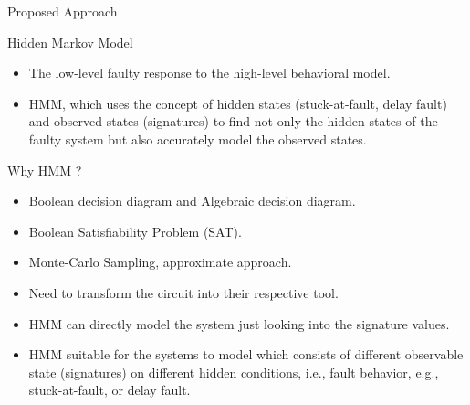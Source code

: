 \documentclass[aspectratio=1610]{beamer}
\begin{document}
\begin{frame}{Proposed Approach}

\vspace{-0.2cm}
\begin{block}{Hidden Markov Model}
\end{block}
\begin{itemize}
\item The low-level faulty response to the high-level behavioral model.
\item HMM, which uses the concept of hidden states (stuck-at-fault, delay fault) and observed states (signatures) to find not only the hidden states of the faulty system but also accurately model the observed states.


\end{itemize}

\begin{block}{Why HMM ?}
\end{block}
\begin{itemize}
\item Boolean decision diagram and Algebraic decision diagram.

\item Boolean Satisfiability Problem (SAT).

\item Monte-Carlo Sampling, approximate approach.

\item Need to transform the circuit into their respective tool.

\item HMM can directly model the system just looking into the signature values.

\item HMM suitable for the systems to model which consists of different observable state (signatures) on different hidden conditions, i.e., fault behavior, e.g., stuck-at-fault, or delay fault.
\end{itemize}


\end{frame}
\end{document}
